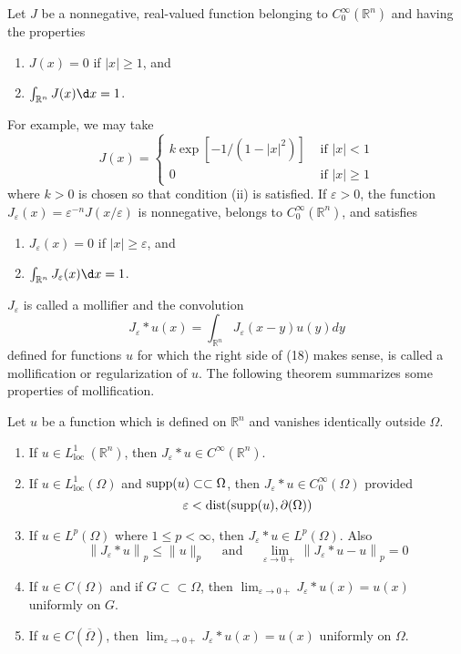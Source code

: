 \begin{para}[Mollifiers]
  Let $J$ be a nonnegative, real-valued function belonging to $C_0^{\infty}(\mathbb{R}^n)$ and having the properties
  \begin{enumerate}[label = (\roman*)]
    \item $J(x)=0$ if $|x| \geq 1$, and
    \item $\int_{\mathbb{R}^n} J(x) \d x=1$.
  \end{enumerate}
  For example, we may take
  \[
  J(x)= \begin{cases}k \exp \left[-1 /\left(1-|x|^2\right)\right] & \text { if }|x|<1 \\ 0 & \text { if }|x| \geq 1\end{cases}
  \]
  where $k>0$ is chosen so that condition (ii) is satisfied. If $\varepsilon>0$, the function $J_\varepsilon(x)=\varepsilon^{-n} J(x / \varepsilon)$ is nonnegative, belongs to $C_0^{\infty}(\mathbb{R}^n)$, and satisfies
  \begin{enumerate}[label = (\roman*)]
    \item $J_\varepsilon(x)=0$ if $|x| \geq \varepsilon$, and
    \item $\int_{\mathbb{R}^n} J_\varepsilon(x) \d x=1$.
  \end{enumerate}
  $J_\varepsilon$ is called a mollifier and the convolution
  \[
  J_\varepsilon * u(x)=\int_{\mathbb{R}^n} J_\varepsilon(x-y) u(y) d y
  \]
  defined for functions $u$ for which the right side of (18) makes sense, is called
  a mollification or regularization of $u$. The following theorem summarizes some properties of mollification.
\end{para}

\begin{theorem}
  Let $u$ be a function which is defined on $\mathbb{R}^n$ and vanishes identically outside $\Omega$.
  \begin{enumerate}[label = (\alph*)]
    \item If $u \in L_{\text {loc }}^1(\mathbb{R}^n)$, then $J_\varepsilon * u \in C^{\infty}(\mathbb{R}^n)$.
    \item If $u \in L_{\mathrm{loc}}^1(\Omega)$ and $\operatorname{supp}(u) \subset\subset \Omega$, then $J_\varepsilon * u \in C_0^{\infty}(\Omega)$ provided
    \[
    \varepsilon<\operatorname{dist}(\operatorname{supp}(u), \partial(\Omega))
    \]
    \item If $u \in L^p(\Omega)$ where $1 \leq p<\infty$, then $J_\varepsilon * u \in L^p(\Omega)$. Also
    \[
    \left\|J_\varepsilon * u\right\|_p \leq\|u\|_p \quad \text { and } \quad \lim _{\varepsilon \rightarrow 0+}\left\|J_\varepsilon * u-u\right\|_p=0
    \]
    \item If $u \in C(\Omega)$ and if $G \subset\subset \Omega$, then $\lim _{\varepsilon \rightarrow 0+} J_\varepsilon * u(x)=u(x)$ uniformly on $G$.
    \item If $u \in C(\overline{\Omega})$, then $\lim _{\varepsilon \rightarrow 0+} J_\varepsilon * u(x)=u(x)$ uniformly on $\Omega$.
  \end{enumerate}
\end{theorem}

